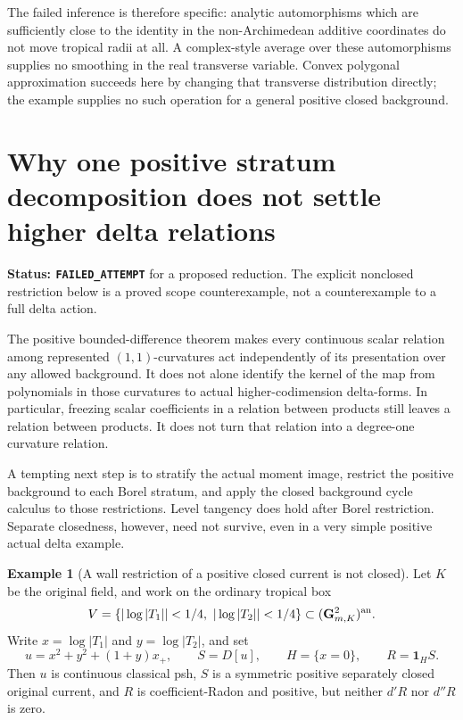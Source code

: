 \documentclass[11pt,a4paper]{article}
\numberwithin{equation}{section}
\theoremstyle{definition}
\newtheorem{example}[theorem]{Example}
\theoremstyle{remark}
\begin{document}
The failed inference is therefore specific: analytic automorphisms
which are sufficiently close to the identity in the non-Archimedean
additive coordinates do not move tropical radii at all. A complex-style
average over these automorphisms supplies no smoothing in the real
transverse variable. Convex polygonal approximation succeeds here by
changing that transverse distribution directly; the example supplies
no such operation for a general positive closed background.



\section{Why one positive stratum decomposition does not settle higher delta relations}
\label{sec:r6-higher-delta-stratum-gate}

\noindent\textbf{Status: \texttt{FAILED\_ATTEMPT}} for a proposed
reduction. The explicit nonclosed restriction below is a proved scope
counterexample, not a counterexample to a full delta action.

The positive bounded-difference theorem makes every continuous scalar
relation among represented $(1,1)$-curvatures act independently of its
presentation over any allowed background. It does not alone identify
the kernel of the map from polynomials in those curvatures to actual
higher-codimension delta-forms. In particular, freezing scalar
coefficients in a relation between products still leaves a relation
between products. It does not turn that relation into a degree-one
curvature relation.

A tempting next step is to stratify the actual moment image, restrict
the positive background to each Borel stratum, and apply the closed
background cycle calculus to those restrictions. Level tangency does
hold after Borel restriction. Separate closedness, however, need not
survive, even in a very simple positive actual delta example.

\begin{example}[A wall restriction of a positive closed current is not closed]
\label{ex:r6-nonclosed-real-wall-restriction}
Let $K$ be the original field, and work on the ordinary tropical box
\[
     V=\{|\log|T_1||<1/4,\ |\log|T_2||<1/4\}
         \subset (\mathbf G_{m,K}^{2})^{\rm an}.
\]
Write $x=\log|T_1|$ and $y=\log|T_2|$, and set
\[
 u=x^2+y^2+(1+y)x_+,
 \qquad S=D[u],\qquad H=\{x=0\},\qquad R=\mathbf1_H S.
\]
Then $u$ is continuous classical psh, $S$ is a symmetric positive
separately closed original current, and $R$ is coefficient-Radon and
positive, but neither $d'R$ nor $d''R$ is zero.
\end{example}
\end{document}
